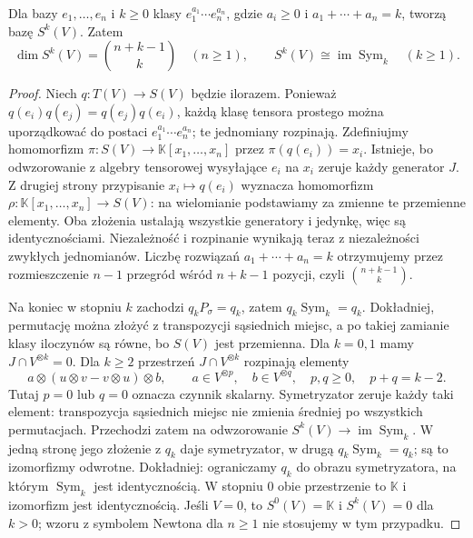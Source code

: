 \begin{stwierdzenie}
\label{prop:sym-baza}
Dla bazy $e_1,\ldots,e_n$ i $k\geq0$ klasy
$e_1^{a_1}\cdots e_n^{a_n}$, gdzie
$a_i\geq0$ i $a_1+\cdots+a_n=k$, tworzą bazę $S^k(V)$.
Zatem
\[
 \dim S^k(V)=\binom{n+k-1}{k}\quad(n\geq1),
 \qquad S^k(V)\cong\operatorname{im}\operatorname{Sym}_k\quad(k\geq1).
\]
\end{stwierdzenie}
\begin{proof}
Niech $q\colon T(V)\to S(V)$ będzie ilorazem.
Ponieważ $q(e_i)q(e_j)=q(e_j)q(e_i)$, każdą klasę tensora
prostego można uporządkować do postaci
$e_1^{a_1}\cdots e_n^{a_n}$; te jednomiany rozpinają.
Zdefiniujmy homomorfizm $\pi\colon S(V)\to
\mathbb K[x_1,\ldots,x_n]$ przez $\pi(q(e_i))=x_i$.
Istnieje, bo odwzorowanie z algebry tensorowej wysyłające $e_i$
na $x_i$ zeruje każdy generator $J$. Z drugiej strony
przypisanie $x_i\mapsto q(e_i)$ wyznacza homomorfizm
$\rho\colon\mathbb K[x_1,\ldots,x_n]\to S(V)$:
na wielomianie podstawiamy za zmienne te przemienne elementy.
Oba złożenia ustalają wszystkie generatory i jedynkę,
więc są identycznościami. Niezależność i rozpinanie
wynikają teraz z niezależności zwykłych jednomianów.
Liczbę rozwiązań $a_1+\cdots+a_n=k$ otrzymujemy przez
rozmieszczenie $n-1$ przegród wśród $n+k-1$ pozycji,
czyli $\binom{n+k-1}{k}$.

Na koniec w stopniu $k$ zachodzi $q_kP_\sigma=q_k$,
zatem $q_k\operatorname{Sym}_k=q_k$. Dokładniej, permutację
można złożyć z transpozycji sąsiednich miejsc, a po takiej
zamianie klasy iloczynów są równe, bo $S(V)$ jest przemienna.
Dla $k=0,1$ mamy $J\cap V^{\otimes k}=0$.
Dla $k\ge2$ przestrzeń $J\cap V^{\otimes k}$ rozpinają elementy
\[
 a\otimes(u\otimes v-v\otimes u)\otimes b,
 \qquad a\in V^{\otimes p},\quad b\in V^{\otimes q},
 \quad p,q\ge0,\quad p+q=k-2.
\]
Tutaj $p=0$ lub $q=0$ oznacza czynnik skalarny.
Symetryzator zeruje każdy taki element: transpozycja
sąsiednich miejsc nie zmienia średniej po wszystkich
permutacjach. Przechodzi zatem
na odwzorowanie $S^k(V)\to\operatorname{im}\operatorname{Sym}_k$.
W jedną stronę jego złożenie z $q_k$ daje symetryzator,
w drugą $q_k\operatorname{Sym}_k=q_k$; są to izomorfizmy odwrotne.
Dokładniej: ograniczamy $q_k$ do obrazu symetryzatora,
na którym $\operatorname{Sym}_k$ jest identycznością.
W stopniu $0$ obie przestrzenie to $\mathbb K$ i izomorfizm
jest identycznością. Jeśli $V=0$, to $S^0(V)=\mathbb K$
i $S^k(V)=0$ dla $k>0$; wzoru z symbolem Newtona dla $n\ge1$
nie stosujemy w tym przypadku.
\end{proof}

